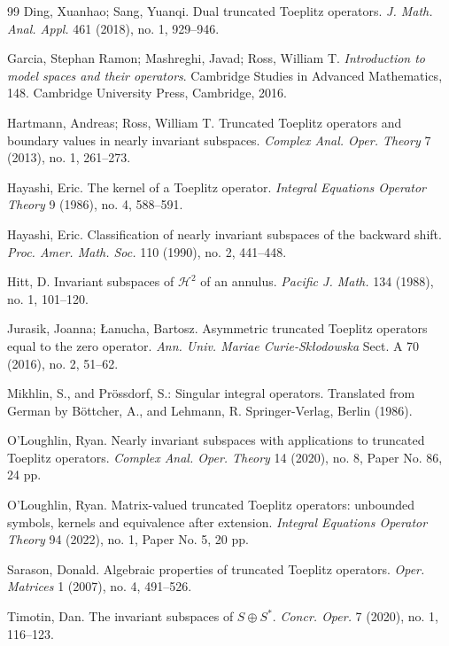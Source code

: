 \documentclass[11pt]{article}
\begin{document}
\begin{thebibliography}{99}
Ding, Xuanhao; Sang, Yuanqi. Dual truncated Toeplitz operators. 
{\em J. Math. Anal. Appl.} 461 (2018), no. 1, 929--946.

Garcia, Stephan Ramon; Mashreghi, Javad; Ross, William T. {\em Introduction to model spaces and their operators}. Cambridge Studies in Advanced Mathematics, 148. Cambridge University Press, Cambridge, 2016.

Hartmann, Andreas; Ross, William T. Truncated Toeplitz operators and boundary values in nearly invariant subspaces. {\em Complex Anal. Oper. Theory\/} 7 (2013), no. 1, 261--273. 

Hayashi, Eric. The kernel of a Toeplitz operator. 
{\em Integral Equations Operator Theory\/} 9 (1986), no. 4, 588--591.

Hayashi, Eric. Classification of nearly invariant subspaces of the backward shift. 
{\em Proc. Amer. Math. Soc.} 110 (1990), no. 2, 441--448.

Hitt, D. Invariant subspaces of ${\mathscr H}^2$ of an annulus. 
{\em Pacific J. Math.} 134 (1988), no. 1, 101--120.

Jurasik, Joanna; {\L}anucha, Bartosz. Asymmetric truncated Toeplitz operators equal to the zero operator. {\em Ann. Univ. Mariae Curie-Sk{\l}odowska\/} Sect. A 70 (2016), no. 2, 51--62. 

Mikhlin, S., and Pr\"ossdorf, S.:  Singular integral operators.  
Translated from German by  B\"ottcher, A., and   Lehmann, R.  
Springer-Verlag, Berlin (1986).

O'Loughlin, Ryan. Nearly invariant subspaces with applications to truncated Toeplitz operators. 
{\em Complex Anal. Oper. Theory\/} 14 (2020), no. 8, Paper No. 86, 24 pp.

O'Loughlin, Ryan. Matrix-valued truncated Toeplitz operators: unbounded symbols, kernels and equivalence after extension. {\em Integral Equations Operator Theory\/} 94 (2022), no. 1, Paper No. 5, 20 pp. 

Sarason, Donald. Algebraic properties of truncated Toeplitz operators. 
{\em Oper. Matrices\/} 1 (2007), no. 4, 491--526.

Timotin, Dan. The invariant subspaces of $S\oplus S^*$. {\em Concr. Oper.} 7 (2020), no. 1, 116--123.

\end{thebibliography}
\end{document}
